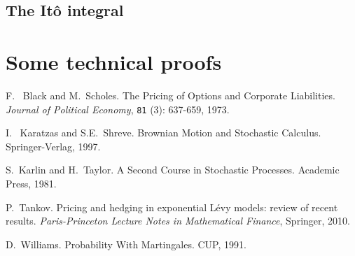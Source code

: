 \documentclass[a4paper]{article}
\theoremstyle{definition}
\numberwithin{equation}{section}
\begin{document}
\subsection{The It\^o integral}


\section{Some technical proofs}



\newpage


\begin{thebibliography}{9}
F.~ Black and M.~Scholes.
The Pricing of Options and Corporate Liabilities.
\textit{Journal of Political Economy}, {\tt 81} (3): 637-659, 1973.

I.~ Karatzas and S.E.~Shreve.
Brownian Motion and Stochastic Calculus.
Springer-Verlag, 1997.

S.~Karlin and H.~Taylor.
A Second Course in Stochastic Processes. 
Academic Press, 1981.

 P.~Tankov.
Pricing and hedging in exponential L\'evy models: review of recent results. 
\textit{Paris-Princeton Lecture Notes in Mathematical Finance}, Springer, 2010. 

D.~Williams.
Probability With Martingales.
CUP, 1991.

\end{thebibliography}


\end{document}

